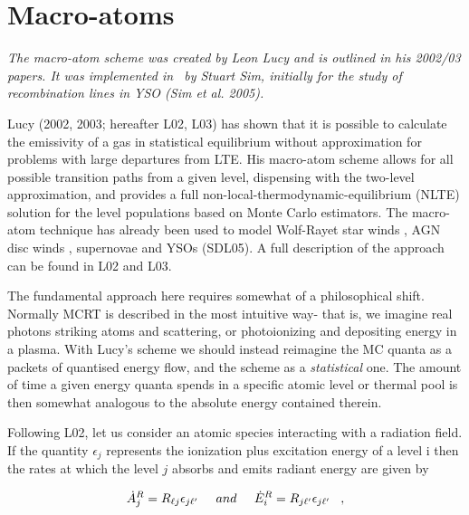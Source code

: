 \section{Macro-atoms}

{\sl The macro-atom scheme was created by Leon Lucy and is outlined in 
his 2002/03 papers. It was implemented in \py\ by Stuart Sim, initially
for the study of recombination lines in YSO (Sim et al. 2005).}

Lucy (2002, 2003\nocite{lucy2002, lucy2003}; hereafter L02, L03) 
has shown that it is possible to calculate the emissivity of a gas in
statistical equilibrium without approximation for problems with large departures
from LTE.
His macro-atom scheme allows for all possible transition paths from a given level,
dispensing with the two-level approximation, and
provides a full non-local-thermodynamic-equilibrium (NLTE) solution
for the level populations based on Monte Carlo estimators. The macro-atom
technique has already been used to model Wolf-Rayet star
winds \citep{sim2004}, AGN disc winds \citep{simlong2008, tatum2012},
supernovae \citep{kromersim2009, kerzendorfsim} and YSOs (SDL05). A full 
description of the approach can be found in L02 and L03. 

The fundamental approach here requires somewhat of a philosophical shift.
Normally MCRT is described in the most intuitive way- that is, we imagine
real photons striking atoms and scattering, or photoionizing 
and depositing energy in a plasma. With Lucy's scheme we should instead 
reimagine the MC quanta as a packets of quantised energy flow, and the scheme as a 
{\em statistical} one. The amount of time a given energy quanta spends in a specific atomic
level or thermal pool is then somewhat analogous to the absolute energy 
contained therein.

Following L02, let us consider an atomic species interacting with a radiation field.
If the quantity $\epsilon_j$ represents the ionization plus excitation energy of 
a level i then the rates at which the level $j$ absorbs and emits radiant energy 
are given by

\begin{equation}
 \dot{A}_{j}^{R} = R_{\ell j} \epsilon_{j \ell^\prime} \;\;\;\;\; and \;\;\;
\;\;  \dot{E}_{i}^{R} = R_{j \ell^\prime} \epsilon_{j \ell^\prime} \;\;\; ,
\end{equation}

